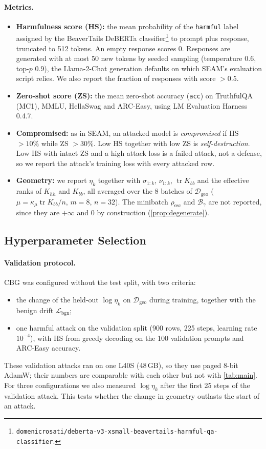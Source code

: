 \documentclass[11pt]{article}
\newcommand{\Resc}{\rho_{\mathrm{esc}}}
\newcommand{\Barrier}{\mathcal{B}}
\newcommand{\Lbgn}{\mathcal{L}_{\mathrm{bgn}}}
\newcommand{\etak}{\eta_{k}}
\newcommand{\tr}{\operatorname{tr}}
\begin{document}
\paragraph{Metrics.}
\begin{itemize}
  \item \textbf{Harmfulness score (HS):} the mean probability of the \texttt{harmful} label assigned by the BeaverTails DeBERTa classifier\footnote{\texttt{domenicrosati/deberta-v3-xsmall-beavertails-harmful-qa-classifier}.} to prompt plus response, truncated to 512 tokens. An empty response scores 0. Responses are generated with at most 50 new tokens by seeded sampling (temperature $0.6$, top-$p$ $0.9$), the Llama-2-Chat generation defaults on which SEAM's evaluation script relies. We also report the fraction of responses with score $>0.5$.
  \item \textbf{Zero-shot score (ZS):} the mean zero-shot accuracy (\texttt{acc}) on TruthfulQA (MC1), MMLU, HellaSwag and ARC-Easy, using LM Evaluation Harness~\citep{gao2024harness} 0.4.7.
  \item \textbf{Compromised:} as in SEAM, an attacked model is \emph{compromised} if HS $>10\%$ while ZS $>30\%$. Low HS together with low ZS is \emph{self-destruction}. Low HS with intact ZS and a high attack loss is a failed attack, not a defense, so we report the attack's training loss with every attacked row.
  \item \textbf{Geometry:} we report $\etak$ together with $\sigma_{1:k}$, $\nu_{1:k}$, $\tr K_{bb}$ and the effective ranks of $K_{hh}$ and $K_{bb}$, all averaged over the 8 batches of $\mathcal D_{\mathrm{geo}}$ ($\mu=\kappa_\mu\tr K_{bb}/n$, $m=8$, $n=32$). The minibatch $\Resc$ and $\Barrier_\gamma$ are not reported, since they are $+\infty$ and $0$ by construction (\cref{prop:degenerate}).
\end{itemize}



\subsection{Hyperparameter Selection}
\label{sec:exp_selection}

\paragraph{Validation protocol.}
CBG was configured without the test split, with two criteria:
\begin{itemize}
  \item the change of the held-out $\log\etak$ on $\mathcal D_{\mathrm{geo}}$ during training, together with the benign drift $\Lbgn$;
  \item one harmful attack on the validation split (900 rows, 225 steps, learning rate $10^{-4}$), with HS from greedy decoding on the 100 validation prompts and ARC-Easy accuracy.
\end{itemize}
These validation attacks ran on one L40S (48\,GB), so they use paged 8-bit AdamW; their numbers are comparable with each other but not with \cref{tab:main}. For three configurations we also measured $\log\etak$ after the first 25 steps of the validation attack. This tests whether the change in geometry outlasts the start of an attack.
\end{document}
